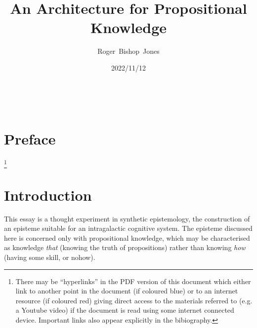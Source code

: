 \documentclass[10pt,titlepage]{article}
\title{\LARGE\bf An Architecture for Propositional Knowledge}
\author{Roger~Bishop~Jones}
\date{\small 2022/11/12}
\newcommand{\ignore}[1]{}
\begin{document}
                               
\begin{titlepage}
\maketitle





\end{titlepage}

\ \

\ignore{
\begin{centering}
{}
\end{centering}
}%

\setcounter{tocdepth}{2}
{\parskip-0pt\tableofcontents}


\pagebreak

\section*{Preface}



\footnote{There may be ``hyperlinks'' in the PDF version of this document which either link to another point in the document  (if coloured blue) or to an internet resource  (if coloured red) giving direct access to the materials referred to (e.g. a Youtube video) if the document is read using some internet connected device.
Important links also appear explicitly in the bibiography.}

\section{Introduction}

This essay is a thought experiment in synthetic epistemology, the construction of an episteme suitable for an intragalactic cognitive system.
The episteme discussed here is concerned only with propositional knowledge, which may be characterised as knowledge \emph{that} (knowing the truth of propositions) rather than knowing \emph{how} (having some skill, or nohow).
\end{document}
